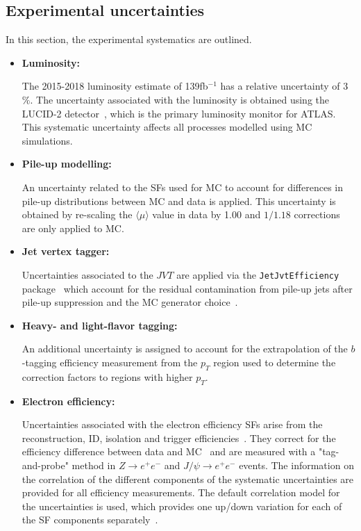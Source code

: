 \subsection{Experimental uncertainties}
\label{subsec:syst_exp}

In this section, the experimental systematics are outlined.

\begin{itemize}
\item \textbf{Luminosity:}

The 2015-2018 luminosity estimate of 139fb$^{-1}$ has a relative uncertainty of 3$\%$. The uncertainty associated with the luminosity is obtained using the LUCID-2 detector~\cite{Avoni:2018}, which is the primary luminosity monitor for ATLAS. This systematic uncertainty affects all processes modelled using MC simulations.


\item \textbf{Pile-up modelling:}

An uncertainty related to the SFs used for MC to account for differences in pile-up distributions between MC and data is applied. This uncertainty is obtained by re-scaling the $\langle \mu \rangle$ value in data by \num{1.00} and $1/1.18$ corrections are only applied to MC.


\item \textbf{Jet vertex tagger:}

Uncertainties associated to the $JVT$ are applied via the \texttt{JetJvtEfficiency} package~\cite{twiki-JVT} which account for the
residual contamination from pile-up jets after pile-up suppression and the MC generator choice~\cite{PERF-2016-06}.


\item \textbf{Heavy- and light-flavor tagging:}


An additional uncertainty is assigned to account for the extrapolation of the $b$-tagging efficiency measurement from the $p_{T}$ region used to determine the correction factors to regions with higher $p_{T}$.


\item \textbf{Electron efficiency:}

Uncertainties associated with the electron efficiency SFs arise from the reconstruction,
ID, isolation and trigger efficiencies~\cite{twiki-elSF}. They correct for the efficiency difference between data and MC~\cite{EGAM-2018-01}
and are measured with a "tag-and-probe" method in $Z\rightarrow e^{+}e^{-}$ and $J/\psi \rightarrow e^{+}e^{-}$ events. The information on the correlation of the different components of the systematic uncertainties are provided for all efficiency  measurements. The default correlation model for the uncertainties is used, which provides one up/down variation
for each of the SF components separately~\cite{twiki-elSF,twiki-elSFunc}.



\end{itemize}
